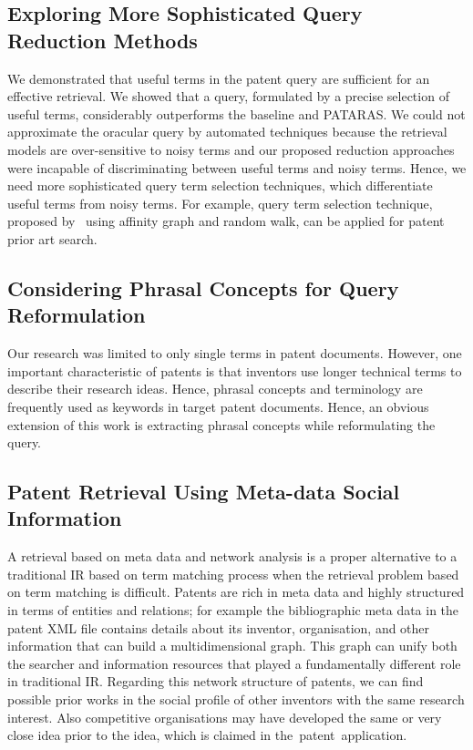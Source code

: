 \subsection{Exploring More Sophisticated Query Reduction Methods}
\label{subsec:SophisticatedQueryReduction}
We demonstrated that useful terms in the patent query are sufficient for an effective retrieval.
We showed that a query, formulated by a precise selection of useful terms, considerably outperforms the baseline and PATARAS. We could not approximate the oracular query by automated techniques 
because the retrieval models are over-sensitive to noisy terms and our proposed reduction approaches were incapable of discriminating between useful terms and noisy terms. 
Hence, we need more sophisticated query term selection techniques, which differentiate useful terms from noisy terms. 
For example, query term selection technique, proposed by~\cite{maxwell2013compact} using affinity graph and random walk, can be applied for patent prior art search.     

\subsection{Considering Phrasal Concepts for Query Reformulation }
\label{subsec: PhraseAnalysis}
Our research was limited to only single terms in patent documents. 
However, one important characteristic of patents is that 
inventors use longer technical terms to describe their research ideas. 
Hence, phrasal concepts and terminology 
are frequently used as keywords in target patent documents.
Hence, an obvious extension of this work is extracting phrasal concepts while reformulating the query. 

\subsection{Patent Retrieval Using Meta-data Social Information}
\label{subsec: Meta-dataNetworkAnalysis}
A retrieval based on meta data and network analysis 
is a proper alternative to a traditional IR based on term matching process 
when the retrieval problem based on term matching is difficult.
Patents are rich in meta data and highly structured in terms of entities and relations; for example 
the bibliographic meta data in the patent XML file contains details about 
its inventor, organisation, and other information that can build a multidimensional graph.
This graph can unify both the searcher and information resources that played a fundamentally different role in traditional IR. 
Regarding this network structure of patents, we can  
find possible prior works in the social profile of other inventors with the same research interest.
Also competitive organisations may have developed the same or very close idea prior to the  
idea, which is claimed in the~patent~application.


